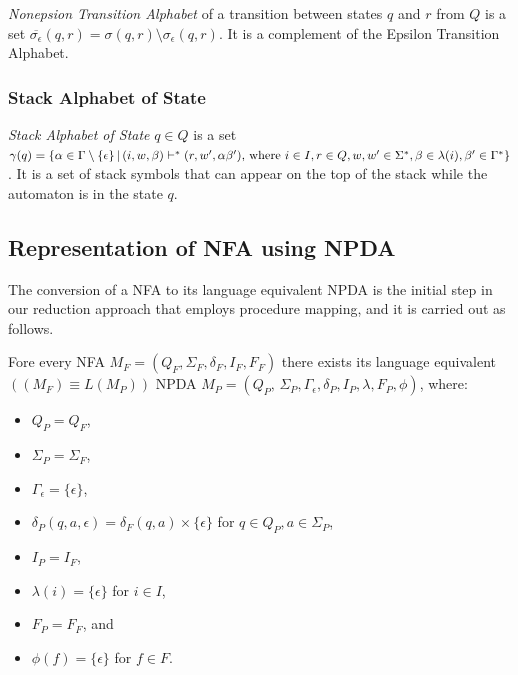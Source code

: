             \textit{Nonepsion Transition Alphabet} of a transition between states $q$ and $r$ from $Q$ is a set $\overline{\sigma_\epsilon}(q, r) = \sigma(q, r) \setminus \sigma_\epsilon(q, r)$. It is a complement of the Epsilon Transition Alphabet.

        \subsubsection*{Stack Alphabet of State}
            \textit{Stack Alphabet of State} $q \in Q$ is a set $\gamma(q) = \{\alpha \in \Gamma \setminus \{\epsilon\}\,|\,(i, w, \beta) \vdash^* (r, w', \alpha\beta')\textnormal{, where }i \in I, r \in Q, w, w' \in \Sigma^*, \beta \in \lambda(i), \beta' \in \Gamma^*\}$. It is a set of stack symbols that can appear on the top of the stack while the automaton is in the state $q$.

    \subsection{Representation of NFA using NPDA}
        \label{sec:NFAasNPDA}
        The conversion of a NFA to its language equivalent NPDA is the initial step in our reduction approach that employs procedure mapping, and it is carried out as follows.

        Fore every NFA $M_{F} = (Q_{F}, \Sigma_{F}, \delta_{F}, I_{F}, F_{F})$ there exists its language equivalent $((M_{F}) \equiv L(M_{P}))$ NPDA $M_{P} = (Q_{P},\, \Sigma_{P}, \Gamma_\epsilon, \delta_{P}, I_{P}, \lambda, F_{P}, \phi)$, where:
            \begin{itemize}
                \item $Q_{P} = Q_{F}$,
                \item $\Sigma_{P} = \Sigma_{F}$,
                \item $\Gamma_\epsilon = \{\epsilon\}$,
                \item $\delta_{P}(q, a, \epsilon) = \delta_{F}(q, a) \times \{\epsilon\}$ for $q \in Q_{P}, a \in \Sigma_{P}$,
                \item $I_{P} = I_{F}$,
                \item $\lambda(i) = \{\epsilon\}$ for $i \in I$,
                \item $F_{P} = F_{F}$, and
                \item $\phi(f) = \{\epsilon\}$ for $f \in F$.
            \end{itemize}

